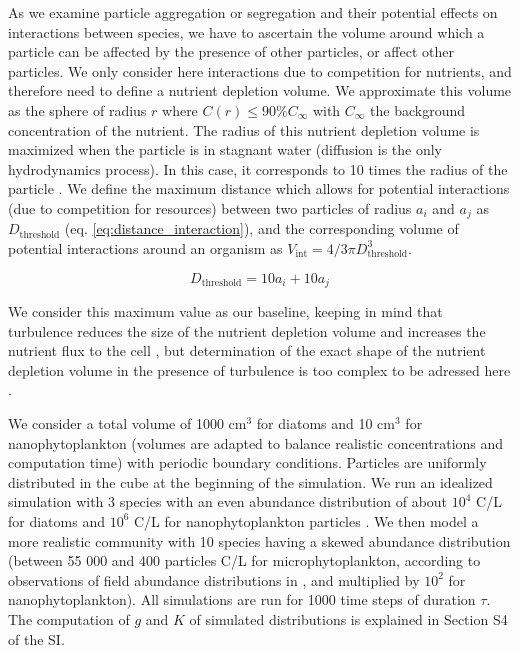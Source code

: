 \documentclass[english]{article}
\begin{document}
As we examine particle aggregation or segregation and their potential
effects on interactions between species, we have to ascertain the
volume around which a particle can be affected by the presence of
other particles, or affect other particles. We only consider here
interactions due to competition for nutrients, and therefore need
to define a nutrient depletion volume. We approximate this volume
as the sphere of radius $r$ where $C(r)\leq90\%C_{\infty}$ with
$C_{\infty}$ the background concentration of the nutrient. The radius
of this nutrient depletion volume is maximized when the particle is
in stagnant water (diffusion is the only hydrodynamics process). In
this case, it corresponds to 10 times the radius of the particle \citep{jumars_physical_1993,karp-boss_nutrient_1996}.
We define the maximum distance which allows for potential interactions
(due to competition for resources) between two particles of radius
$a_{i}$ and $a_{j}$ as $D_{\text{threshold}}$ (eq. \ref{eq:distance_interaction}),
and the corresponding volume of potential interactions around an organism
as $V_{\text{int}}=4/3\pi D_{\text{threshold}}^{3}$.

\begin{equation}
D_{\text{threshold}}=10a_{i}+10a_{j}\label{eq:distance_interaction}
\end{equation}

We consider this maximum value as our baseline, keeping in mind that
turbulence reduces the size of the nutrient depletion volume and increases
the nutrient flux to the cell \citep{arnott_artificially_2021}, but
determination of the exact shape of the nutrient depletion volume
in the presence of turbulence is too complex to be adressed here \citep{karp-boss_nutrient_1996}.

\medskip{}

We consider a total volume of 1000 cm$^{3}$ for diatoms and 10 cm$^{3}$
for nanophytoplankton (volumes are adapted to balance realistic concentrations
and computation time) with periodic boundary conditions. Particles
are uniformly distributed in the cube at the beginning of the simulation.
We run an idealized simulation with 3 species with an even abundance
distribution of about $10^{4}$ C/L for diatoms \citep{picoche_strong_2020}
and $10^{6}$ C/L for nanophytoplankton particles \citep{edwards_mixotrophy_2019}.
We then model a more realistic community with 10 species having a
skewed abundance distribution (between 55 000 and 400 particles C/L
for microphytoplankton, according to observations of field abundance
distributions in \citealp{picoche_strong_2020}, and multiplied by
$10^{2}$ for nanophytoplankton). All simulations are run for 1000
time steps of duration $\tau$. The computation of $g$ and $K$ of
simulated distributions is explained in Section S4 of the SI.
\end{document}
